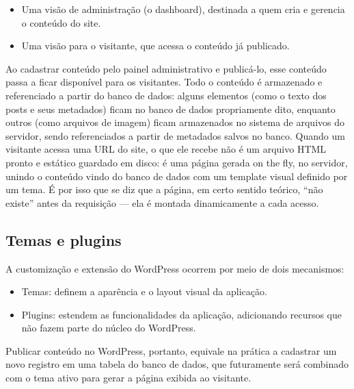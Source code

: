 \begin{itemize}
  \item Uma visão de administração (o dashboard), destinada a quem cria e gerencia o conteúdo do site.
\end{itemize}

\begin{itemize}
  \item Uma visão para o visitante, que acessa o conteúdo já publicado.
\end{itemize}

Ao cadastrar conteúdo pelo painel administrativo e publicá-lo, esse conteúdo passa a ficar disponível para os visitantes. Todo o conteúdo é armazenado e referenciado a partir do banco de dados: alguns elementos (como o texto dos posts e seus metadados) ficam no banco de dados propriamente dito, enquanto outros (como arquivos de imagem) ficam armazenados no sistema de arquivos do servidor, sendo referenciados a partir de metadados salvos no banco. Quando um visitante acessa uma URL do site, o que ele recebe não é um arquivo HTML pronto e estático guardado em disco: é uma página gerada on the fly, no servidor, unindo o conteúdo vindo do banco de dados com um template visual definido por um tema. É por isso que se diz que a página, em certo sentido teórico, “não existe” antes da requisição — ela é montada dinamicamente a cada acesso.

\subsection{Temas e plugins}

A customização e extensão do WordPress ocorrem por meio de dois mecanismos:

\begin{itemize}
  \item Temas: definem a aparência e o layout visual da aplicação.
\end{itemize}

\begin{itemize}
  \item Plugins: estendem as funcionalidades da aplicação, adicionando recursos que não fazem parte do núcleo do WordPress.
\end{itemize}

Publicar conteúdo no WordPress, portanto, equivale na prática a cadastrar um novo registro em uma tabela do banco de dados, que futuramente será combinado com o tema ativo para gerar a página exibida ao visitante.

